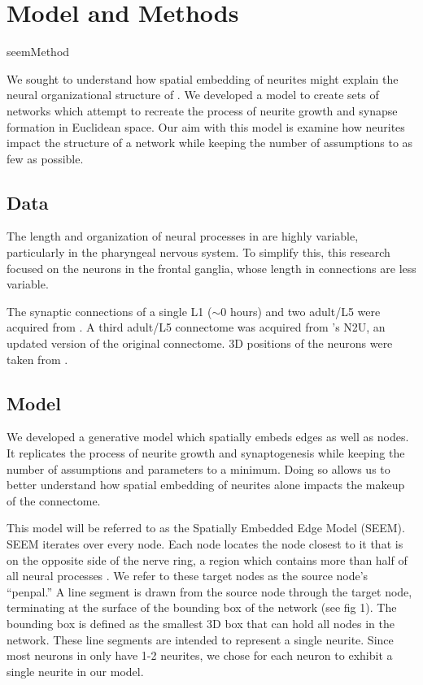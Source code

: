 \section{Model and Methods}

{seemMethod}

We sought to understand how spatial embedding of neurites might explain the neural organizational structure of \ce. 
We developed a model to create sets of networks which attempt to recreate the process of neurite growth and synapse formation in Euclidean space. 
Our aim with this model is examine how neurites impact the structure of a network while keeping the number of assumptions to as few as possible.

\subsection{Data}
The length and organization of neural processes in \ce are highly variable, particularly in the pharyngeal nervous system. 
To simplify this, this research focused on the neurons in the frontal ganglia, whose length in connections are less variable. 

The synaptic connections of a single L1 ($\sim 0$ hours) and two adult/L5 \ce were acquired from \cite{Witvliet}.
A third adult/L5 connectome was acquired from \cite{Durbin}'s N2U, an updated version of the original \cite{White} connectome. 
3D positions of the neurons were taken from \cite{Skuhersky}. 

\subsection{Model}
We developed a generative model which spatially embeds edges as well as nodes. 
It replicates the process of neurite growth and synaptogenesis while keeping the number of assumptions and parameters to a minimum. 
Doing so allows us to better understand how spatial embedding of neurites alone impacts the makeup of the connectome.

This model will be referred to as the Spatially Embedded Edge Model (SEEM). 
SEEM iterates over every node. 
Each node locates the node closest to it that is on the opposite side of the nerve ring, a region which contains more than half of all neural processes \citep{Altun}. 
We refer to these target nodes as the source node's ``penpal.''
A line segment is drawn from the source node through the target node, terminating at the surface of the bounding box of the network (see fig 1). 
The bounding box is defined as the smallest 3D box that can hold all nodes in the network. 
These line segments are intended to represent a single neurite. 
Since most neurons in \ce only have 1-2 neurites, we chose for each neuron to exhibit a single neurite in our model.

